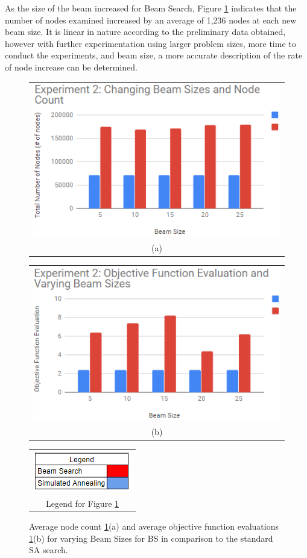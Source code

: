 \documentclass[10pt, twocolumn]{article}
\begin{document}
As the size of the beam increased for Beam Search, Figure \ref{exp_two} indicates that the number of nodes examined increased by an average of 1,236 nodes at each new beam size. It is linear in nature according to the preliminary data obtained, however with further experimentation using larger problem sizes, more time to conduct the experiments, and beam size, a more accurate description of the rate of node increase can be determined.

\begin{figure}[!h]
    \centering
    \begin{tabular}[b]{c}
        \includegraphics[width=.70\linewidth]{exp_two_node.png} \\
        \small (a)
    \end{tabular} \qquad
    \begin{tabular}[b]{c}
        \includegraphics[width=.70\linewidth]{exp_two_obj.png} \\
        \small (b)
    \end{tabular}
     \begin{tabular}[b]{c}
        \includegraphics[width=.3\linewidth]{legend.png} \\
        \small Legend for Figure \ref{exp_two}
    \end{tabular}
    \caption{Average node count \ref{exp_two}(a) and average objective function evaluations \ref{exp_two}(b) for varying Beam Sizes for BS in comparison to the standard SA search.}  \label{exp_two}
\end{figure}
\end{document}

